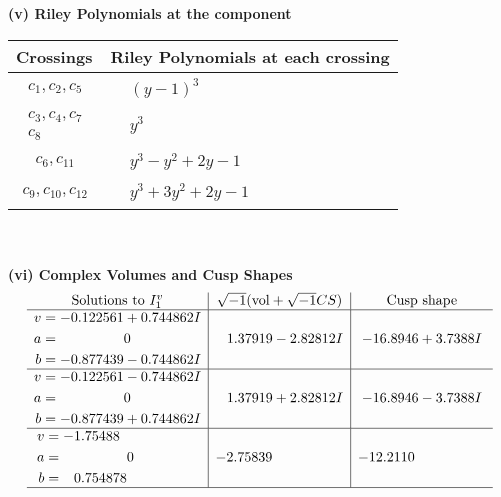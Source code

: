 \documentclass[1p]{elsarticle_modified}
\theoremstyle{definition}
\newcommand{\I}{\sqrt{-1}}
\begin{document}
\newpage\renewcommand{\arraystretch}{1}
\flushleft \textbf{(v) Riley Polynomials at the component}\newline \\
\begin{tabular}{m{50pt}|m{274pt}}
Crossings & \hspace{64pt}Riley Polynomials at each crossing \\
\hline $$\begin{aligned}c_{1},c_{2},c_{5}\end{aligned}$$&$\begin{aligned}
&(y-1)^3
\end{aligned}$\\
\hline $$\begin{aligned}c_{3},c_{4},c_{7}\\c_{8}\end{aligned}$$&$\begin{aligned}
&y^3
\end{aligned}$\\
\hline $$\begin{aligned}c_{6},c_{11}\end{aligned}$$&$\begin{aligned}
&y^3- y^2+2 y-1
\end{aligned}$\\
\hline $$\begin{aligned}c_{9},c_{10},c_{12}\end{aligned}$$&$\begin{aligned}
&y^3+3 y^2+2 y-1
\end{aligned}$\\
\hline
\end{tabular}\\~\\
\newpage\flushleft \textbf{(vi) Complex Volumes and Cusp Shapes}
$$\begin{array}{c|c|c}  
\text{Solutions to }I^v_{1}& \I (\text{vol} + \sqrt{-1}CS) & \text{Cusp shape}\\
 \hline 
\begin{aligned}
v &= -0.122561 + 0.744862 I \\
a &= \phantom{-0.000000 } 0 \\
b &= -0.877439 - 0.744862 I\end{aligned}
 & \phantom{-}1.37919 - 2.82812 I & -16.8946 + 3.7388 I \\ \hline\begin{aligned}
v &= -0.122561 - 0.744862 I \\
a &= \phantom{-0.000000 } 0 \\
b &= -0.877439 + 0.744862 I\end{aligned}
 & \phantom{-}1.37919 + 2.82812 I & -16.8946 - 3.7388 I \\ \hline\begin{aligned}
v &= -1.75488\phantom{ +0.000000I} \\
a &= \phantom{-0.000000 } 0 \\
b &= \phantom{-}0.754878\phantom{ +0.000000I}\end{aligned}
 & -2.75839\phantom{ +0.000000I} & -12.2110\phantom{ +0.000000I}\\
 \hline 
 \end{array}$$\newpage
\end{document}
